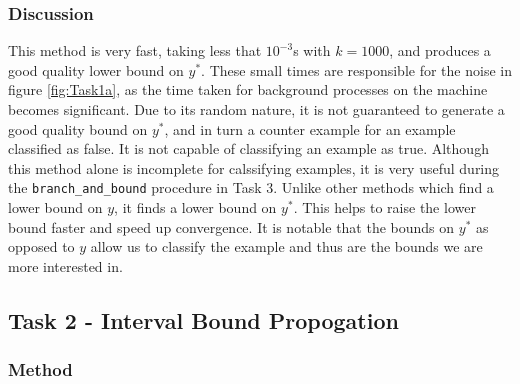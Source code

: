 \documentclass[11pt]{article}
\begin{document}
\subsubsection{Discussion}
This method is very fast, taking less that $10^{-3}$s with $k=1000$, and produces a good quality lower bound on $y^*$. 
These small times are responsible for the noise in figure \ref{fig:Task1a}, as the time taken for background processes on the machine becomes significant.
Due to its random nature, it is not guaranteed to generate a good quality bound on $y^*$, and in turn a counter example for an example classified as false. 
It is not capable of classifying an example as true.
Although this method alone is incomplete for calssifying examples, it is very useful during the \texttt{branch\_and\_bound} procedure in Task 3. 
Unlike other methods which find a lower bound on $y$, it finds a lower bound on $y^*$.
This helps to raise the lower bound faster and speed up convergence. 
It is notable that the bounds on $y^*$ as opposed to $y$ allow us to classify the example and thus are the bounds we are more interested in.


\subsection{Task 2 - Interval Bound Propogation}

\subsubsection{Method}

\end{document}
